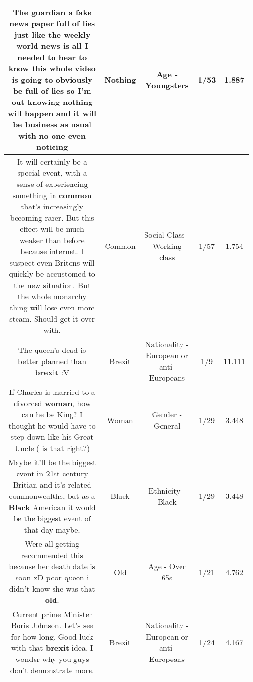 \documentclass[11pt]{article}
\newlength\mylength
\begin{document}
\begin{center}
\begin{longtable}{|C{.65\mylength}|C{.30\mylength}|C{.12\mylength}|C{.12\mylength}|C{.12\mylength}|}
  \small The guardian a fake news paper full of lies just like the weekly world news is all I needed to hear to know this whole video is going to obviously be full of lies so I'm out knowing \textbf{nothing} will happen and it will be business as usual with no one even noticing\normalsize   & Nothing & Age - Youngsters & 1/53 & 1.887 \\  \hline
  \small It will certainly be a special event, with a sense of experiencing something in \textbf{common} that's increasingly becoming rarer. But this effect will be much weaker than before because internet. I suspect even Britons will quickly be accustomed to the new situation. But the whole monarchy thing will lose even more steam. Should get it over with.\normalsize   & Common & Social Class - Working class & 1/57 & 1.754 \\  \hline
  \small The queen's dead is better planned than \textbf{brexit} :V\normalsize   & Brexit & Nationality - European or anti-Europeans & 1/9 & 11.111 \\  \hline
  \small If Charles is married to a divorced \textbf{woman}, how can he be King? I thought he would have to step down like his Great Uncle ( is that right?)\normalsize   & Woman & Gender - General & 1/29 & 3.448 \\  \hline
  \small Maybe it'll be the biggest event in 21st century Britian and it's related commonwealths, but as a \textbf{Black} American it would be the biggest event of that day maybe.\normalsize   & Black & Ethnicity - Black & 1/29 & 3.448 \\  \hline
  \small Were all getting recommended this because her death date is soon xD poor queen i didn't know she was that \textbf{old}.\normalsize   & Old & Age - Over 65s & 1/21 & 4.762 \\  \hline
  \small Current prime Minister Boris Johnson. Let's see for how long. Good luck with that \textbf{brexit} idea. I wonder why you guys don't demonstrate more.\normalsize   & Brexit & Nationality - European or anti-Europeans & 1/24 & 4.167 \\  \hline

\end{longtable}
\end{center}
\end{document}
